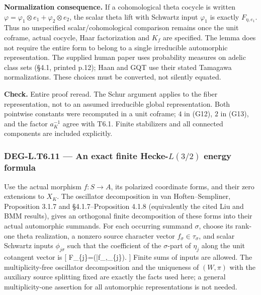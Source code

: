 \documentclass[11pt,a4paper]{article}
\theoremstyle{definition}
\begin{document}
\textbf{Normalization consequence.} If a cohomological theta cocycle is
written \(\varphi=\varphi_1\otimes e_1+\varphi_2\otimes e_2\), the
scalar theta lift with Schwartz input \(\varphi_1\) is exactly
\(F_{\eta,e_1}\). Thus no unspecified scalar/cohomological comparison
remains once the unit coframe, actual cocycle, Haar factorization and
\(K_f\) are specified. The lemma does not require the entire form to
belong to a single irreducible automorphic representation. The supplied
human paper uses probability measures on adelic class sets (§4.1,
printed p.12); Haan and GQT use their stated Tamagawa normalizations.
These choices must be converted, not silently equated.

\textbf{Check.} Entire proof reread. The Schur argument applies to the
fiber representation, not to an assumed irreducible global
representation. Both pointwise constants were recomputed in a unit
coframe; \(4\) in (G12), \(2\) in (G13), and the factor \(a_K^{-1}\)
agree with T6.1. Finite stabilizers and all connected components are
included explicitly.

\subsubsection{\texorpdfstring{DEG-L.T6.11 --- An exact finite
Hecke-\(L(3/2)\) energy
formula}{DEG-L.T6.11 --- An exact finite Hecke-L(3/2) energy formula}}\label{deg-l.t6.11-an-exact-finite-hecke-l32-energy-formula}

Use the actual morphism \(f:S\to A\), its polarized coordinate forms,
and their zero extensions to \(X_K\). The oscillator decomposition in
van Hoften--Sempliner, Proposition 3.1.7 and §4.1.7--Proposition 4.1.8
(equivalently the cited Liu and BMM results), gives an orthogonal finite
decomposition of these forms into their actual automorphic summands. For
each occurring summand \(\sigma\), choose its rank-one theta
realization, a nonzero source character vector
\(f_\sigma\in\tau_\sigma\), and scalar Schwartz inputs
\(\phi_{j\sigma}\) such that the coefficient of the \(\sigma\)-part of
\(\eta_j\) along the unit cotangent vector is {[}
F\_\{j\sigma\}=\theta(\bar f\_\sigma,\phi\_\{j\sigma\}). {]} Finite sums
of inputs are allowed. The multiplicity-free oscillator decomposition
and the uniqueness of \((W,\pi)\) with the auxiliary source splitting
fixed are exactly the facts used here; a general multiplicity-one
assertion for all automorphic representations is not needed.
\end{document}
